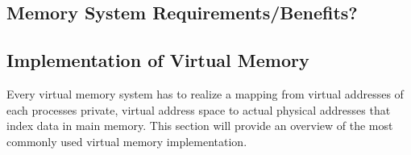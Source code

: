 \subsection{Memory System Requirements/Benefits?}


\subsection{Implementation of Virtual Memory}
Every virtual memory system has to realize a mapping from virtual addresses of each processes
private, virtual address space to actual physical addresses that index data in main memory.
This section will provide an overview of the most commonly used virtual memory implementation.

